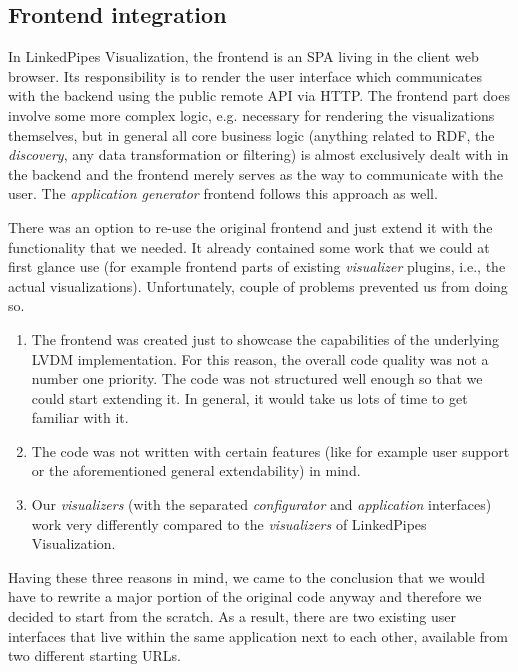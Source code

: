 \subsection{Frontend integration}
\label{sec:system-proposal:architecture-analysis:frontend-integration}

In LinkedPipes Visualization, the frontend is an SPA living in the client web browser. Its responsibility is to render the user interface which communicates with the backend using the public remote API via HTTP. The frontend part does involve some more complex logic, e.g. necessary for rendering the visualizations themselves, but in general all core business logic (anything related to RDF, the \emph{discovery}, any data transformation or filtering) is almost exclusively dealt with in the backend and the frontend merely serves as the way to communicate with the user. The \emph{application generator} frontend follows this approach as well.

There was an option to re-use the original frontend and just extend it with the functionality that we needed. It already contained some work that we could at first glance use (for example frontend parts of existing \emph{visualizer} plugins, i.e., the actual visualizations). Unfortunately, couple of problems prevented us from doing so. 

\begin{enumerate}
\item The frontend was created just to showcase the capabilities of the underlying LVDM implementation. For this reason, the overall code quality was not  a number one priority. The code was not structured well enough so that we could start extending it. In general, it would take us lots of time to get familiar with it. 
\item The code was not written with certain features (like for example user support or the aforementioned general extendability) in mind.
\item Our \emph{visualizers} (with the separated \emph{configurator} and \emph{application} interfaces) work very differently compared to the \emph{visualizers} of LinkedPipes Visualization.

\end{enumerate}
Having these three reasons in mind, we came to the conclusion that we would have to rewrite a major portion of the original code anyway and therefore we decided to start from the scratch. As a result, there are two existing user interfaces that live within the same application next to each other, available from two different starting URLs.

